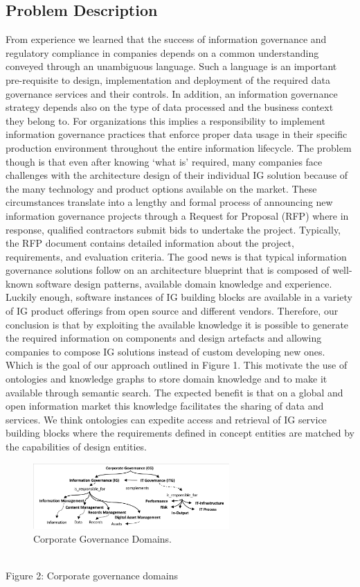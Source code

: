 \documentclass[a4paper,twoside]{article}
\begin{document}
\subsection{Problem Description}
From experience we learned that the success of information governance and regulatory compliance in companies depends on a common understanding conveyed through an unambiguous language. Such a language is an important pre-requisite to design, implementation and deployment of the required data governance services and their controls. In addition, an information governance strategy depends also on the type of data processed and the business context they belong to. For organizations this implies a responsibility to implement information governance practices that enforce proper data usage in their specific production environment throughout the entire information lifecycle. 
The problem though is that even after knowing ‘what is’ required, many companies face challenges with the architecture design of their individual IG solution because of the many technology and product options available on the market. 
These circumstances translate into a lengthy and formal process of announcing new information governance projects through a Request for Proposal (RFP) where in response, qualified contractors submit bids to undertake the project. Typically, the RFP document contains detailed information about the project, requirements, and evaluation criteria. 
The good news is that typical information governance solutions follow on an architecture blueprint that is composed of well-known software design patterns, available domain knowledge and experience. Luckily enough, software instances of IG building blocks are available in a variety of IG product offerings from open source and different vendors. Therefore, our conclusion is that by exploiting the available knowledge it is possible to generate the required information on components and design artefacts and allowing companies to compose IG solutions instead of custom developing new ones. Which is the goal of our approach outlined in Figure 1. This motivate the use of ontologies and knowledge graphs to store domain knowledge and to make it available through semantic search. The expected benefit is that on a global and open information market this knowledge facilitates the sharing of data and services. We think ontologies can expedite access and retrieval of IG service building blocks where the requirements defined in concept entities are matched by the capabilities of design entities. 
%
\begin{figure}[ht]
  \centering
    \includegraphics[clip, trim=1cm 7cm 0 0 , width=7.5cm]{images/Fig2-CG.Domains.png}
    \caption{Corporate Governance Domains.}
  \label{fig:g-domains}
\end{figure}
\\ Figure 2: Corporate governance domains
\end{document}
